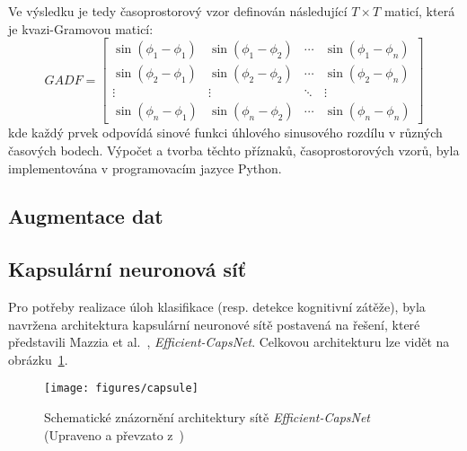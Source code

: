 Ve výsledku je tedy časoprostorový vzor definován následující $T \times T$
maticí, která je kvazi-Gramovou maticí:
\begin{equation}
    GADF = \left[\begin{array}{cccc}
            \sin \left(\phi_1-\phi_1\right) & \sin \left(\phi_1-\phi_2\right) & \cdots & \sin \left(\phi_1-\phi_n\right) \\
            \sin \left(\phi_2-\phi_1\right) & \sin \left(\phi_2-\phi_2\right) & \cdots & \sin \left(\phi_2-\phi_n\right) \\
            \vdots                          & \vdots                          & \ddots & \vdots                          \\
            \sin \left(\phi_n-\phi_1\right) & \sin \left(\phi_n-\phi_2\right) & \cdots & \sin \left(\phi_n-\phi_n\right)
        \end{array}\right]
\end{equation}
kde každý prvek odpovídá sinové funkci úhlového sinusového rozdílu v různých
časových bodech. Výpočet a tvorba těchto příznaků, časoprostorových vzorů, byla
implementována v programovacím jazyce Python.

\subsection{Augmentace dat}
\label{subsec:augmentace_dat}

\subsection{Kapsulární neuronová síť}
\label{subsec:kapsularni_sit}
Pro potřeby realizace úloh klasifikace (resp. detekce kognitivní zátěže), byla
navržena architektura kapsulární neuronové sítě postavená na řešení, které
představili Mazzia et al.~\cite{Mazzia2021}, \textit{Efficient-CapsNet}.
Celkovou architekturu lze vidět na obrázku~\ref{fig:architektura}.

\begin{figure}[h]
    \begin{center}
        \texttt{[image: figures/capsule]}
        \caption{Schematické znázornění architektury sítě
            \textit{Efficient-CapsNet} (Upraveno a převzato z~\cite{Zhou2021})}
        \label{fig:architektura}
    \end{center}
\end{figure}

